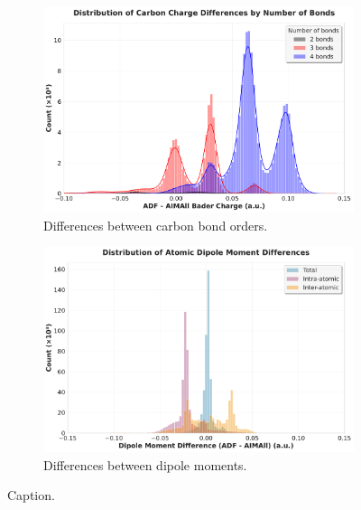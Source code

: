 \begin{figure}[h]
  \centering
  \begin{subfigure}[b]{0.43\linewidth}
    \includegraphics[width=\linewidth]{../results/qtaim/img/histogram_carbon_bonds}
    \caption{Differences between carbon bond orders.}
    \label{histogram_carbon}
  \end{subfigure}
  \begin{subfigure}[b]{0.43\linewidth}
    \includegraphics[width=\linewidth]{../results/qtaim/img/histogram_dipole_total}
    \caption{Differences between dipole moments.}
    \label{histogram_dipole}
  \end{subfigure}
  \caption{Caption.}
  \label{fig_coop}
\end{figure}



